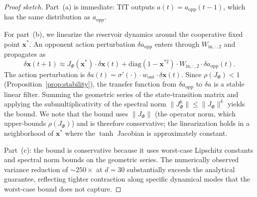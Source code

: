 \documentclass[11pt,a4paper]{article}
\theoremstyle{definition}
\newcommand{\Wout}{w_{\mathrm{out}}}
\newcommand{\xstate}{\mathbf{x}}
\begin{document}
\begin{proof}[Proof sketch]
Part~(a) is immediate: TfT outputs $a(t) = a_{\mathrm{opp}}(t-1)$, which
has the same distribution as $a_{\mathrm{opp}}$.

For part~(b), we linearize the reservoir dynamics around the cooperative
fixed point $\xstate^{*}$.  An opponent action perturbation
$\delta a_{\mathrm{opp}}$ enters through $W_{\mathrm{in},{:,2}}$ and propagates as
\[
\delta \xstate(t+1) \approx J_{\Phi}(\xstate^{*}) \cdot \delta \xstate(t)
  + \mathrm{diag}(1 - \xstate^{*2}) \cdot W_{\mathrm{in},{:,2}} \cdot \delta a_{\mathrm{opp}}(t).
\]
The action perturbation is $\delta a(t) = \sigma'(\cdot) \cdot \Wout \cdot
\delta \xstate(t)$.  Since $\rho(J_{\Phi}) < 1$
(Proposition~\ref{prop:stability}), the transfer function from
$\delta a_{\mathrm{opp}}$ to $\delta a$ is a stable linear filter.  Summing
the geometric series of the state-transition matrix and applying the
submultiplicativity of the spectral norm $\|J_{\Phi}^k\| \leq \|J_{\Phi}\|^k$
yields the bound.  We note that the bound uses $\|J_{\Phi}\|$ (the operator norm,
which upper-bounds $\rho(J_{\Phi})$) and is therefore conservative; the
linearization holds in a neighborhood of $\xstate^{*}$ where the $\tanh$
Jacobian is approximately constant.

Part~(c): the bound is conservative because it uses worst-case
Lipschitz constants and spectral norm bounds on the geometric series.
The numerically observed variance reduction of $\sim 250\times$ at
$d = 30$ substantially exceeds the analytical guarantee, reflecting
tighter contraction along specific dynamical modes that the
worst-case bound does not capture.
\end{proof}
\end{document}
